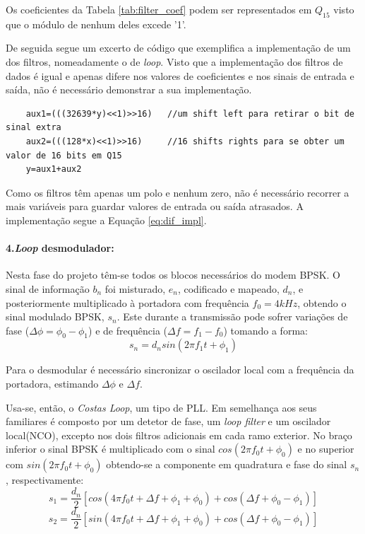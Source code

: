 \documentclass[11pt]{article}
\numberwithin{equation}{section}
\begin{document}
	Os coeficientes da Tabela \ref{tab:filter_coef} podem ser representados em $ Q_{15} $ visto que o módulo de nenhum deles excede '1'.
	
	De seguida segue um excerto de código que exemplifica a implementação de um dos filtros, nomeadamente o de \textit{loop}. Visto que a implementação dos filtros de dados é igual e apenas difere nos valores de coeficientes e nos sinais de entrada e saída, não é necessário demonstrar a sua implementação.
	\begin{lstlisting}
	aux1=(((32639*y)<<1)>>16)	//um shift left para retirar o bit de sinal extra
	aux2=(((128*x)<<1)>>16)		//16 shifts rights para se obter um valor de 16 bits em Q15
	y=aux1+aux2
	\end{lstlisting}
	
	Como os filtros têm apenas um polo e nenhum zero, não é necessário recorrer a mais variáveis para guardar valores de entrada ou saída atrasados. A implementação segue a Equação \ref{eq:dif_impl}.
	
	\paragraph{4.\textit{Loop} desmodulador:} \hspace{0pt}
	\label{para:P3-4}
	
	Nesta fase do projeto têm-se todos os blocos necessários do modem BPSK. O sinal de informação $b_n$ foi misturado, $e_n$, codificado e mapeado, $d_n$, e posteriormente multiplicado à portadora com frequência $f_0 = 4kHz$, obtendo o sinal modulado BPSK, $s_n$. Este durante a transmissão pode sofrer variações de fase ($\Delta\phi=\phi_0-\phi_1$) e de frequência ($\Delta f = f_1-f_0$) tomando a forma:
	\begin{equation}
	s_n=d_nsin(2\pi f_1t+ \phi_1)
	\end{equation}
	
	Para o desmodular é necessário sincronizar o oscilador local com a frequência da portadora, estimando $\Delta\phi$ e $\Delta f$.
	
	Usa-se, então, o \textit{Costas Loop}, um tipo de PLL. Em semelhança aos seus familiares é composto por um detetor de fase, um \textit{loop filter} e um oscilador local(NCO), excepto nos dois filtros adicionais em cada ramo exterior. No braço inferior o sinal BPSK é multiplicado com o sinal $cos(2\pi f_0t+\phi_0)$ e no superior com $sin(2\pi f_0t+ \phi_0)$ obtendo-se a componente em quadratura e fase do sinal $s_n$, respectivamente: 
	\begin{equation}
	s_1=\frac{d_n}{2}[cos(4\pi f_0t+\Delta f+\phi_1+\phi_0)+cos(\Delta f+\phi_0-\phi_1)]
	\end{equation}
	\begin{equation}
	s_2=\frac{d_n}{2}[sin(4\pi f_0t+\Delta f+\phi_1+\phi_0)+cos(\Delta f+\phi_0-\phi_1)]
	\end{equation} 
	
\end{document}
